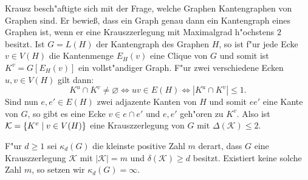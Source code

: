 Krausz \cite{Krausz43} besch"aftigte sich mit der Frage, welche Graphen Kantengraphen von Graphen sind. Er bewie{\ss}, dass ein Graph genau dann ein Kantengraph eines Graphen ist, wenn er eine Krauszzerlegung mit Maximalgrad h"ochstens $2$ besitzt. Ist $G=L(H)$ der Kantengraph des Graphen $H$, so ist f"ur jede Ecke $v\in V(H)$ die Kantenmenge $E_H(v)$ eine Clique von $G$ und somit ist $K^{v}=G[E_H(v)]$ ein vollst"andiger Graph. F"ur zwei verschiedene Ecken $u,v\in V(H)$ gilt dann:
$$K^{u}\cap K^{v} \neq \varnothing \Leftrightarrow uv \in E(H) \Leftrightarrow |K^{u} \cap K^{v}| \leq 1.$$
Sind nun $e,e'\in E(H)$ zwei adjazente Kanten von $H$ und somit $ee'$ eine Kante von $G$, so gibt es eine Ecke $v\in e\cap e'$ und $e,e'$ geh"oren zu $K^{v}$. Also ist $\mathcal{K} = \{K^{v} \;|\; v\in V(H) \}$ eine Krauszzerlegung von $G$ mit $\Delta(\mathcal{K}) \leq 2$.

F"ur $d \geq 1$ sei $\kappa_d(G)$ die kleinste positive Zahl $m$ derart, dass $G$ eine Krauszzerlegung $\mathcal K$ mit $|\mathcal K| = m$ und $\delta(\mathcal K) \geq d$ besitzt. Existiert keine solche Zahl $m$, so setzen wir $\kappa_{d}(G) = \infty$.

